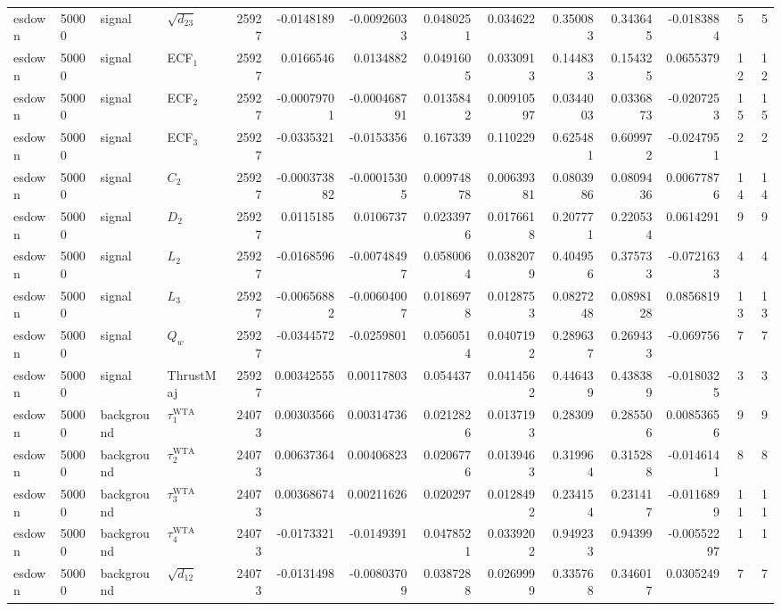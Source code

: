 \begin{landscape}
\begin{longtable}{llll r rrrr rr r rr}
esdown & 50000 & signal & $\sqrt{d_{23}}$ & 25927 & -0.0148189 & -0.00926033 & 0.0480251 & 0.034622 & 0.350083 & 0.343645 & -0.0183884 & 5 & 5 \\
esdown & 50000 & signal & ECF$_1$ & 25927 & 0.0166546 & 0.0134882 & 0.0491605 & 0.0330913 & 0.144833 & 0.154325 & 0.0655379 & 12 & 12 \\
esdown & 50000 & signal & ECF$_2$ & 25927 & -0.00079701 & -0.000468791 & 0.0135842 & 0.00910597 & 0.0344003 & 0.0336873 & -0.0207253 & 15 & 15 \\
esdown & 50000 & signal & ECF$_3$ & 25927 & -0.0335321 & -0.0153356 & 0.167339 & 0.110229 & 0.625481 & 0.609972 & -0.0247951 & 2 & 2 \\
esdown & 50000 & signal & $C_2$ & 25927 & -0.000373882 & -0.00015305 & 0.00974878 & 0.00639381 & 0.0803986 & 0.0809436 & 0.00677876 & 14 & 14 \\
esdown & 50000 & signal & $D_2$ & 25927 & 0.0115185 & 0.0106737 & 0.0233976 & 0.0176618 & 0.207771 & 0.220534 & 0.0614291 & 9 & 9 \\
esdown & 50000 & signal & $L_2$ & 25927 & -0.0168596 & -0.00748497 & 0.0580064 & 0.0382079 & 0.404956 & 0.375733 & -0.0721633 & 4 & 4 \\
esdown & 50000 & signal & $L_3$ & 25927 & -0.00656882 & -0.00604007 & 0.0186978 & 0.0128753 & 0.0827248 & 0.0898128 & 0.0856819 & 13 & 13 \\
esdown & 50000 & signal & $Q_w$ & 25927 & -0.0344572 & -0.0259801 & 0.0560514 & 0.0407192 & 0.289637 & 0.269433 & -0.069756 & 7 & 7 \\
esdown & 50000 & signal & ThrustMaj & 25927 & 0.00342555 & 0.00117803 & 0.054437 & 0.0414562 & 0.446439 & 0.438389 & -0.0180325 & 3 & 3 \\
esdown & 50000 & background & $\tau_1^{\mathrm{WTA}}$ & 24073 & 0.00303566 & 0.00314736 & 0.0212826 & 0.0137193 & 0.28309 & 0.285506 & 0.00853656 & 9 & 9 \\
esdown & 50000 & background & $\tau_2^{\mathrm{WTA}}$ & 24073 & 0.00637364 & 0.00406823 & 0.0206776 & 0.0139463 & 0.319964 & 0.315288 & -0.0146141 & 8 & 8 \\
esdown & 50000 & background & $\tau_3^{\mathrm{WTA}}$ & 24073 & 0.00368674 & 0.00211626 & 0.020297 & 0.0128492 & 0.234154 & 0.231417 & -0.0116899 & 11 & 11 \\
esdown & 50000 & background & $\tau_4^{\mathrm{WTA}}$ & 24073 & -0.0173321 & -0.0149391 & 0.0478521 & 0.0339202 & 0.949233 & 0.94399 & -0.00552297 & 1 & 1 \\
esdown & 50000 & background & $\sqrt{d_{12}}$ & 24073 & -0.0131498 & -0.00803709 & 0.0387288 & 0.0269999 & 0.335768 & 0.346017 & 0.0305249 & 7 & 7 \\

\end{longtable}
\end{landscape}

